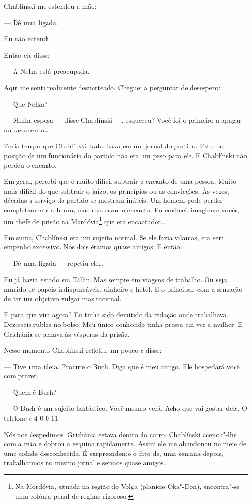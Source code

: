 Chablínski me estendeu a mão:

--- Dê uma ligada.

Eu não entendi.

Então ele disse:

--- A Nelka está preocupada.

Aqui me senti realmente desnorteado. Cheguei a perguntar de desespero:

--- Que Nelka?

--- Minha esposa --- disse Chablínski ---, esqueceu? Você foi o primeiro
a apagar no casamento\ldots{}

Fazia tempo que Chablínski trabalhava em um jornal do partido. Estar na
posição de um funcionário do partido não era um peso para ele. E
Chablínski não perdeu o encanto.

Em geral, percebi que é muito difícil subtrair o encanto de uma pessoa.
Muito mais difícil do que subtrair o juízo, os princípios ou as
convicções. Às vezes, décadas a serviço do partido se mostram inúteis.
Um homem pode perder completamente a honra, mas conservar o encanto. Eu
conheci, imaginem vocês, um chefe de prisão na Mordóvia\footnote{Na
  Mordóvia, situada na região do Volga (planície Oka"-Don), encontra"-se
  uma colônia penal de regime rigoroso.} que era encantador\ldots{}

Em suma, Chablínski era um sujeito normal. Se ele fazia vilanias, era
sem empenho excessivo. Nós dois éramos quase amigos. E então:

--- Dê uma ligada --- repetiu ele\ldots{}

Eu já havia estado em Tállin. Mas sempre em viagens de trabalho. Ou
seja, munido de papéis indispensáveis, dinheiro e hotel. E o principal:
com a sensação de ter um objetivo vulgar mas racional.

E para que vim agora? Eu tinha sido demitido da redação onde trabalhava.
Dezesseis rublos no bolso. Meu único conhecido tinha pressa em ver a
mulher. E Grichánia se achava às vésperas da prisão.

Nesse momento Chablínski refletiu um pouco e disse:

--- Tive uma ideia. Procure o Buch. Diga que é meu amigo. Ele hospedará
você com prazer.

--- Quem é Buch?

--- O Buch é um sujeito fantástico. Você mesmo verá. Acho que vai gostar
dele. O telefone é 4-0-0-11.

Nós nos despedimos. Grichánia estava dentro do carro. Chablínski
acenou"-lhe com a mão e dobrou a esquina rapidamente. Assim ele me
abandonou no meio de uma cidade desconhecida. É surpreendente o fato de,
uma semana depois, trabalharmos no mesmo jornal e sermos quase amigos.

